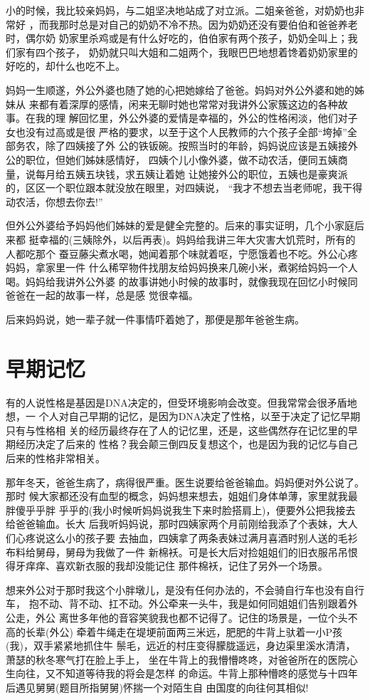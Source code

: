 \documentclass[12pt]{book}
\begin{document}
小的时候，我比较亲妈妈，与二姐坚决地站成了对立派。二姐亲爸爸，对奶奶也非常好
，而我那时总是对自己的奶奶不冷不热。因为奶奶还没有要伯伯和爸爸养老时，偶尔奶
奶家里杀鸡或是有什么好吃的，伯伯家有两个孩子，奶奶全叫上；我们家有四个孩子，
奶奶就只叫大姐和二姐两个，我眼巴巴地想着馋着奶奶家里的好吃的，却什么也吃不上。

妈妈一生顺遂，外公外婆也随了她的心把她嫁给了爸爸。妈妈对外公外婆和她的姊妹从
来都有着深厚的感情，闲来无聊时她也常常对我讲外公家簇这边的各种故事。在我的理
解回忆里，外公外婆的爱情是幸福的，外公的性格闲淡，他们对子女也没有过高或是很
严格的要求，以至于这个人民教师的六个孩子全部“垮掉”全部务农，除了四姨接了外
公的铁钣碗。按照当时的年龄，妈妈说应该是五姨接外公的职位，但她们姊妹感情好，
四姨个儿小像外婆，做不动农活，便同五姨商量，说每月给五姨五块钱，求五姨让着她
让她接外公的职位，五姨也是豪爽派的，区区一个职位跟本就没放在眼里，对四姨说，
“我才不想去当老师呢，我干得动农活，你想去你去!”

但外公外婆给予妈妈他们姊妹的爱是健全完整的。后来的事实证明，几个小家庭后来都
挺幸福的(三姨除外，以后再表)。妈妈给我讲三年大灾害大饥荒时，所有的人都吃那个
蚕豆藤尖煮水喝，她闻着那个味就着呕，宁愿饿着也不吃。外公心疼妈妈，拿家里一件
什么稀罕物件找朋友给妈妈换来几碗小米，煮粥给妈妈一个人喝。妈妈给我讲外公外婆
的故事讲她小时候的故事时，就像我现在回忆小时候同爸爸在一起的故事一样，总是感
觉很幸福。

后来妈妈说，她一辈子就一件事情吓着她了，那便是那年爸爸生病。
\section{早期记忆}
\label{sec-9-13}

有的人说性格是基因是DNA决定的，但受环境影响会改变。但我常常会很矛盾地想，一
个人对自己早期的记忆，是因为DNA决定了性格，以至于决定了记忆早期只有与性格相
关的经历最终存在了人的记忆里，还是，这些偶然存在记忆里的早期经历决定了后来的
性格？我会颠三倒四反复想这个，也是因为我的记忆与自己后来的性格非常相关。

那年冬天，爸爸生病了，病得很严重。医生说要给爸爸输血。妈妈便对外公说了。那时
候大家都还没有血型的概念，妈妈想来想去，姐姐们身体单薄，家里就我最胖傻乎乎胖
乎乎的(我小时候听妈妈说我生下来时脸搭肩上)，便要外公把我接去给爸爸输血。长大
后我听妈妈说，那时四姨家两个月前刚给我添了个表妹，大人们心疼说这么小的孩子要
去抽血，四姨拿了两条表妹过满月喜酒时别人送的毛衫布料给舅母，舅母为我做了一件
新棉袄。可是长大后对捡姐姐们的旧衣服吊吊恨得牙痒痒、喜欢新衣服的我却没能记住
那件棉袄，记住了另外一个场景。

想来外公对于那时我这个小胖墩儿，是没有任何办法的，不会骑自行车也没有自行车，
抱不动、背不动、扛不动。外公牵来一头牛，我是如何同姐姐们告别跟着外公走，外公
离世多年他的音容笑貌我也都不记得了。记住的场景是，一位个头不高的长辈(外公) 
牵着牛绳走在堤埂前面两三米远，肥肥的牛背上驮着一小P孩(我)，双手紧紧地抓住牛
鬃毛，远近的村庄变得朦胧遥远，身边渠里溪水清清，萧瑟的秋冬寒气打在脸上手上，
坐在牛背上的我懵懵咚咚，对爸爸所在的医院心生向往，又不知道等待我的将会是怎样
的命运。牛背上那种懵咚的感觉与十四年后遇见舅舅(题目所指舅舅)怀揣一个对陌生自
由国度的向往何其相似!
\end{document}
